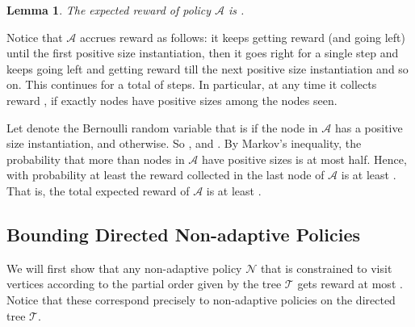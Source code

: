 \documentclass[11pt,letterpaper]{article}
\newtheorem{lemma}[theorem]{Lemma}
\numberwithin{algorithm}{section}
\newenvironment{proof}{

\noindent{\bf Proof:}}
{\hfill


}
\newcommand{\A}[0]{{\ensuremath{\mathcal{A}}}\xspace}
\newcommand{\N}[0]{{\ensuremath{\mathcal{N}}}\xspace}
\newcommand{\T}{\ensuremath{\mathcal{T}}\xspace}
\begin{document}
\begin{lemma}\label{lem:ad-profit}
The expected reward of policy \A is .
\end{lemma}
\begin{proof}
Notice that \A accrues reward as follows: it keeps getting reward  (and going left) until the first positive size instantiation, then it goes right for a single step and keeps going left and getting reward  till the next positive size instantiation and so on. This continues  for a total of  steps.
In particular, at any time  it collects reward , if exactly  nodes have positive sizes among the  nodes seen.

Let  denote the Bernoulli random variable that is  if the  node in \A has a positive size instantiation, and  otherwise. So , and
. By Markov's inequality, the probability that more than 
nodes in \A have positive sizes is at most half. Hence, with probability at least  the reward collected in the last node of \A is at least . That is, the total expected reward of \A is at least .
\end{proof}

\subsection{Bounding Directed Non-adaptive Policies}\label{subsec:dir-gap}
We will first show that any non-adaptive policy \N
that is constrained to visit vertices according to the partial order given by the tree \T
gets reward at most . 
Notice that these correspond precisely to non-adaptive policies on the directed tree \T.
\end{document}
